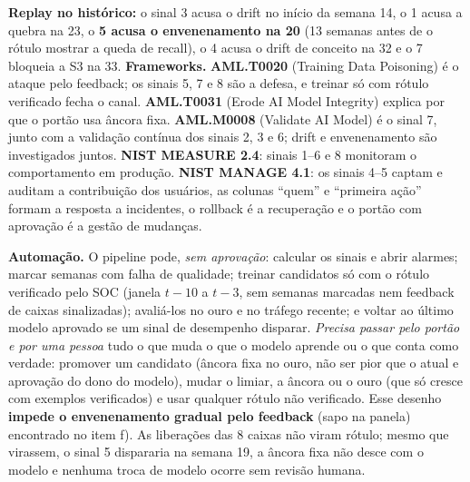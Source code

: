 \documentclass[10pt,a4paper]{article}
\begin{document}
\vspace{-3pt}
\textbf{Replay no histórico:} o sinal 3 acusa o drift no início da semana 14, o 1 acusa a quebra na 23, o \textbf{5 acusa o envenenamento na 20}
(13 semanas antes de o rótulo mostrar a queda de recall), o 4 acusa o drift de conceito na 32 e o 7 bloqueia a S3 na 33.
\textbf{Frameworks.} \textbf{AML.T0020} (Training Data Poisoning) é o ataque pelo feedback; os sinais 5, 7 e 8 são a defesa, e treinar só com rótulo verificado fecha o canal.
\textbf{AML.T0031} (Erode AI Model Integrity) explica por que o portão usa âncora fixa.
\textbf{AML.M0008} (Validate AI Model) é o sinal 7, junto com a validação contínua dos sinais 2, 3 e 6; drift e envenenamento são investigados juntos.
\textbf{NIST MEASURE 2.4}: sinais 1--6 e 8 monitoram o comportamento em produção.
\textbf{NIST MANAGE 4.1}: os sinais 4--5 captam e auditam a contribuição dos usuários, as colunas ``quem'' e ``primeira ação'' formam a resposta a incidentes, o rollback é a recuperação e o portão com aprovação é a gestão de mudanças.

\textbf{Automação.} O pipeline pode, \emph{sem aprovação}: calcular os sinais e abrir alarmes; marcar semanas com falha de qualidade; treinar candidatos só com o rótulo verificado pelo SOC (janela $t-10$ a $t-3$, sem semanas marcadas nem feedback de caixas sinalizadas); avaliá-los no ouro e no tráfego recente; e voltar ao último modelo aprovado se um sinal de desempenho disparar. \emph{Precisa passar pelo portão e por uma pessoa} tudo o que muda o que o modelo aprende ou o que conta como verdade: promover um candidato (âncora fixa no ouro, não ser pior que o atual e aprovação do dono do modelo), mudar o limiar, a âncora ou o ouro (que só cresce com exemplos verificados) e usar qualquer rótulo não verificado. Esse desenho \textbf{impede o envenenamento gradual pelo feedback} (sapo na panela) encontrado no item f). As liberações das 8 caixas não viram rótulo; mesmo que virassem, o sinal 5 dispararia na semana 19, a âncora fixa não desce com o modelo e nenhuma troca de modelo ocorre sem revisão humana.
\end{document}
